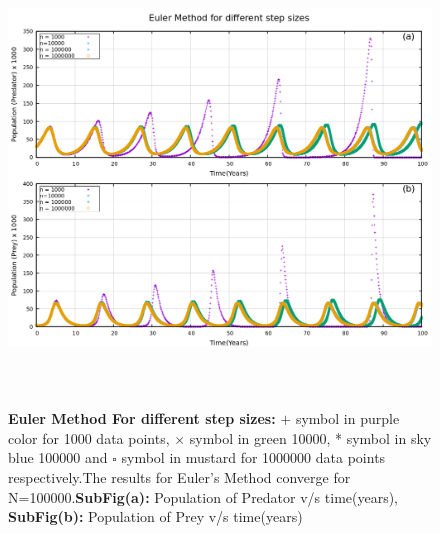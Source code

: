 \documentclass[12pt]{article}
\begin{document}
\begin{figure}[h] %
    \centering
    \includegraphics[width=15cm,height=12cm]{euler_diff_h.png}
\caption{\textbf{Euler Method For different step sizes:} $+$ symbol in purple color for 1000 data points, $\times$ symbol in green 10000, * symbol in sky blue 100000 and $\square$ symbol in mustard for 1000000 data points respectively.The results for Euler's Method converge for N=100000.\newline \textbf{SubFig(a):} Population of Predator v/s time(years), \textbf{SubFig(b):} Population of Prey v/s time(years)  }
\end{figure}
\end{document}

